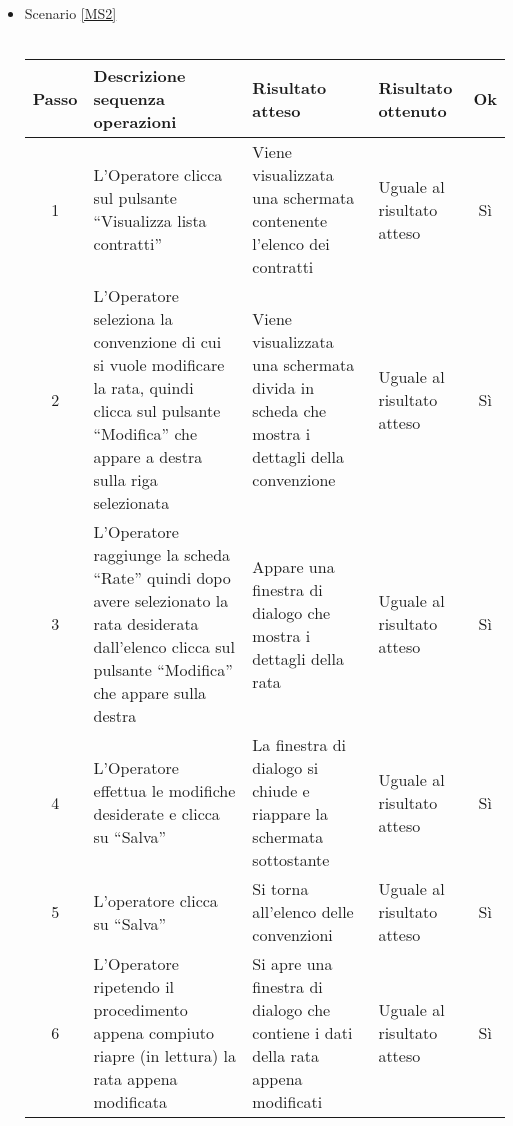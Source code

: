 \begin{itemize}
 \item Scenario \ref{MS2}\\\\
 {
 \footnotesize
  \begin{longtable}{|c|p{3cm}|p{3cm}|p{3cm}|c|}
    \hline
    Passo & Descrizione sequenza operazioni & Risultato atteso & Risultato ottenuto & Ok\\
    \hline
    1 & L'Operatore clicca sul pulsante ``Visualizza lista contratti'' & Viene visualizzata una schermata contenente l'elenco dei contratti & Uguale 
      al risultato atteso& Sì\\
    \hline
    2 & L'Operatore seleziona la convenzione di cui si vuole modificare la rata, quindi clicca sul pulsante ``Modifica'' che appare a destra sulla riga selezionata& Viene visualizzata una schermata divida in scheda che mostra i dettagli
    della convenzione& Uguale al risultato atteso & Sì\\
    \hline
    3 & L'Operatore raggiunge la scheda ``Rate'' quindi dopo avere selezionato la rata desiderata dall'elenco clicca sul pulsante ``Modifica'' che appare sulla destra& Appare una finestra di dialogo che mostra i dettagli della rata & Uguale al risultato atteso & Sì\\
    \hline
    4 & L'Operatore effettua le modifiche desiderate e clicca su ``Salva'' & La finestra di dialogo si chiude e riappare la schermata sottostante & Uguale al risultato atteso& Sì\\
    \hline
    5 & L'operatore clicca su ``Salva''& Si torna all'elenco delle convenzioni & Uguale al risultato atteso & Sì\\
    \hline
    6  & L'Operatore ripetendo il procedimento appena compiuto riapre (in lettura) la rata appena modificata & Si apre una finestra di dialogo che contiene i dati della rata appena modificati & Uguale al risultato atteso & Sì\\
    \hline
\end{longtable}
}



\end{itemize}
